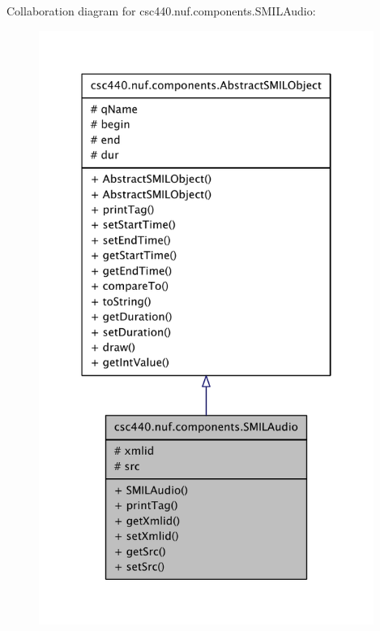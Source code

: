 Collaboration diagram for csc440.\-nuf.\-components.\-S\-M\-I\-L\-Audio\-:
\nopagebreak
\begin{figure}[H]
\begin{center}
\leavevmode
\includegraphics[width=310pt]{classcsc440_1_1nuf_1_1components_1_1_s_m_i_l_audio__coll__graph}
\end{center}
\end{figure}
